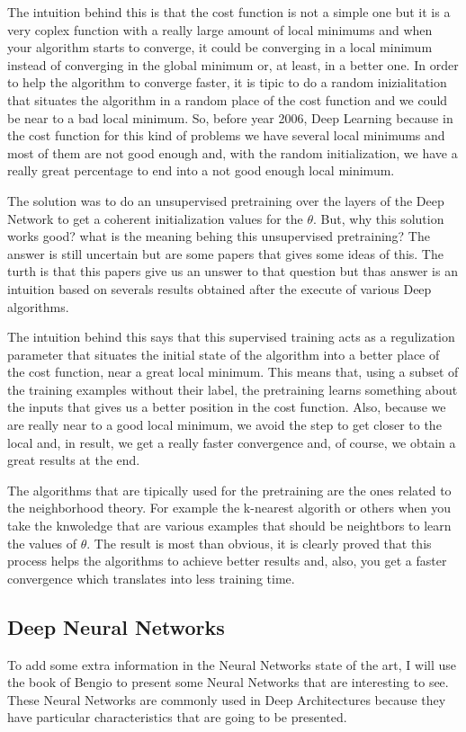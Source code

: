 \documentclass[12pt]{article}
\begin{document}
The intuition behind this is that the cost function is not a simple one but it is a very coplex function with a really large amount of local minimums and when your algorithm starts to converge, it could be converging in a local minimum instead of converging in the global minimum or, at least, in a better one. In order to help the algorithm to converge faster, it is tipic to do a random inizialitation that situates the algorithm in a random place of the cost function and we could be near to a bad local minimum. So, before year 2006, Deep Learning because in the cost function for this kind of problems we have several local minimums and most of them are not good enough and, with the random initialization, we have a really great percentage to end into a not good enough local minimum. 

The solution was to do an unsupervised pretraining over the layers of the Deep Network to get a coherent initialization values for the $\theta$. But, why this solution works good? what is the meaning behing this unsupervised pretraining? The answer is still uncertain but are some papers that gives some ideas of this. The turth is that this papers give us an unswer to that question but thas answer is an intuition based on severals results obtained after the execute of various Deep algorithms.

The intuition behind this says that this supervised training acts as a regulization parameter that situates the initial state of the algorithm into a better place of the cost function, near a great local minimum. This means that, using a subset of the training examples without their label, the pretraining learns something about the inputs that gives us a better position in the cost function. Also, because we are really near to a good local minimum, we avoid the step to get closer to the local and, in result, we get a really faster convergence and, of course, we obtain a great results at the end.

The algorithms that are tipically used for the pretraining are the ones related to the neighborhood theory. For example the k-nearest algorith or others when you take the knwoledge that are various examples that should be neightbors to learn the values of $\theta$. The result is most than obvious, it is clearly proved that this process helps the algorithms to achieve better results and, also, you get a faster convergence which translates into less training time.

\subsection{Deep Neural Networks}
To add some extra information in the Neural Networks state of the art, I will use the book of Bengio \cite{bengio2009learning} to present some Neural Networks that are interesting to see. These Neural Networks are commonly used in Deep Architectures because they have particular characteristics that are going to be presented.
\end{document}
